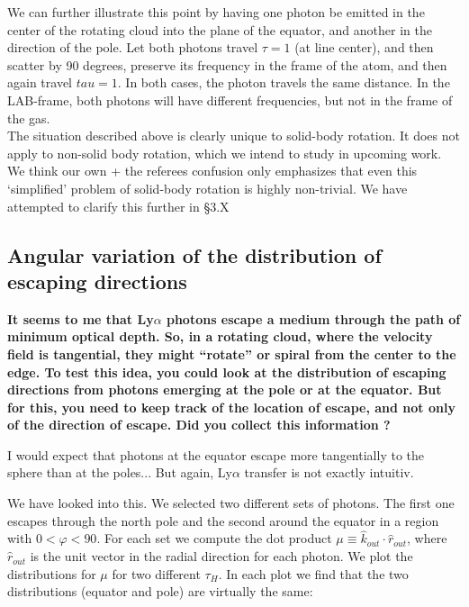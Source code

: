 \documentclass[12pt]{article}
\begin{document}
We can further illustrate this point by having one photon be emitted
in the center of the rotating cloud into the plane of the equator, and
another in the direction of the pole. Let both photons travel $\tau=1$
(at line center), and then scatter by 90 degrees, preserve its
frequency in the frame of the atom, and then again travel $tau=1$. In
both cases, the photon travels the same distance. In the LAB-frame,
both photons will have different frequencies, but not in the frame of
the gas.\\ 

The situation described above is clearly unique to solid-body
rotation. It does not apply to non-solid body rotation, which we
intend to study in upcoming work. We think our own + the referees
confusion only emphasizes that even this `simplified' problem of
solid-body rotation is highly non-trivial. We have attempted to
clarify this further in \S 3.X 

\subsection*{Angular variation of the distribution of escaping directions}

{\bf It seems to me that Ly$\alpha$ photons escape a medium through
  the path of minimum optical depth. So, in a rotating cloud, where
  the velocity field is tangential, they might “rotate” or spiral from
  the center to the edge. To test this idea, you could look at the
  distribution of escaping directions from photons emerging at the
  pole or at the equator. But for this, you need to keep track of the
  location of escape, and not only of the direction of escape. Did you
  collect this information ? 

I would expect that photons at the equator escape more tangentially to
the sphere than at the poles... But again, Ly$\alpha$ transfer is not
exactly intuitiv.} 

We have looked into this. We selected two different sets of
photons. The first one escapes through the north pole and the second
around the equator in a region with $0<\varphi<90$. For each set we
compute the dot product $\mu\equiv\hat{k}_{out}\cdot\hat{r}_{out}$,
where $\hat{r}_{out}$ is the unit vector in the radial direction for
each photon. We plot the distributions for $\mu$ for two different
$\tau_H$. In each plot we find that the two distributions (equator and
pole) are virtually the same: 
 
\end{document}
